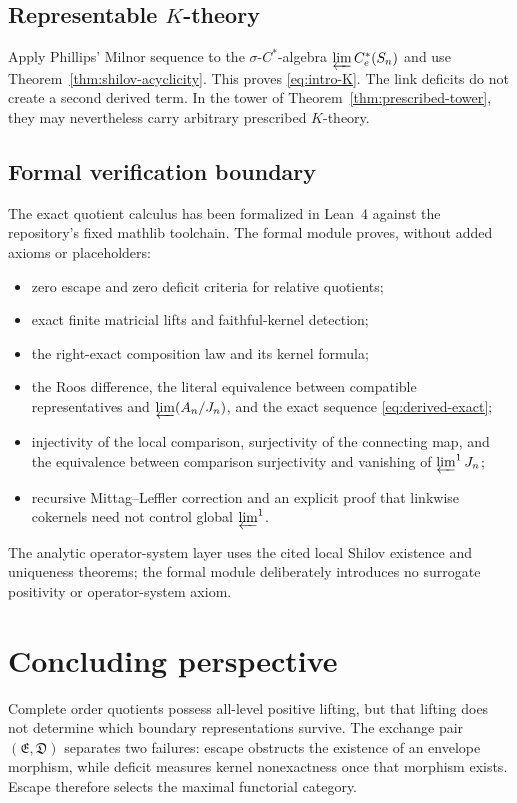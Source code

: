 \documentclass[11pt,a4paper]{amsart}
\theoremstyle{plain}
\theoremstyle{definition}
\newcommand{\Ce}{C_e^*}
\newcommand{\Esc}{\mathfrak E}
\newcommand{\Def}{\mathfrak D}
\begin{document}
\subsection{Representable \texorpdfstring{$K$}{K}-theory}

Apply Phillips' Milnor sequence \cite[Theorem~3.2]{Phillips1989} to the $\sigma$-$C^*$-algebra
$\varprojlim\Ce(S_n)$ and use Theorem~\ref{thm:shilov-acyclicity}.  This proves
\eqref{eq:intro-K}.  The link deficits do not create a second derived term.  In the tower of
Theorem~\ref{thm:prescribed-tower}, they may nevertheless carry arbitrary prescribed $K$-theory.

\subsection{Formal verification boundary}

The exact quotient calculus has been formalized in Lean~4 against the repository's fixed mathlib
toolchain.  The formal module proves, without added axioms or placeholders:
\begin{itemize}
\item zero escape and zero deficit criteria for relative quotients;
\item exact finite matricial lifts and faithful-kernel detection;
\item the right-exact composition law and its kernel formula;
\item the Roos difference, the literal equivalence between compatible representatives and
      $\varprojlim(A_n/J_n)$, and the exact sequence \eqref{eq:derived-exact};
\item injectivity of the local comparison, surjectivity of the connecting map, and the equivalence
      between comparison surjectivity and vanishing of $\varprojlim^1J_n$;
\item recursive Mittag--Leffler correction and an explicit proof that linkwise cokernels need not
      control global $\varprojlim^1$.
\end{itemize}
The analytic operator-system layer uses the cited local Shilov existence and uniqueness theorems;
the formal module deliberately introduces no surrogate positivity or operator-system axiom.

\section{Concluding perspective}\label{sec:conclusion}

Complete order quotients possess all-level positive lifting, but that lifting does not determine
which boundary representations survive.  The exchange pair $(\Esc,\Def)$ separates two failures:
escape obstructs the existence of an envelope morphism, while deficit measures kernel
nonexactness once that morphism exists.  Escape therefore selects the maximal functorial category.
\end{document}
